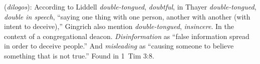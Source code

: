 \item[Disinforming,]

(\textit{dilogos}):
According to Liddell \emph{double-tongued}, \emph{doubtful}, in Thayer \emph{double-tongued}, \emph{double in speech}, ``saying one thing with one person, another with another (with intent to deceive),'' Gingrich also mention \emph{double-tongued}, \emph{insincere}. In the context of a congregational deacon. \emph{Disinformation} as ``false information spread in order to deceive people.'' And \emph{misleading} as ``causing someone to believe something that is not true.''
Found in 1~Tim 3:8.
